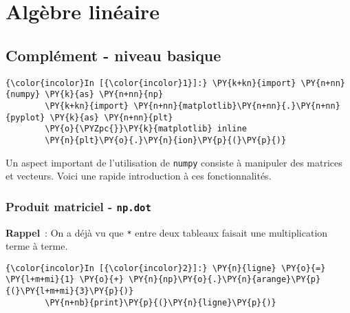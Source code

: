     
    
    
    

    

    \hypertarget{alguxe8bre-linuxe9aire}{%
\section{Algèbre linéaire}\label{alguxe8bre-linuxe9aire}}

    \hypertarget{compluxe9ment---niveau-basique}{%
\subsection{Complément - niveau
basique}\label{compluxe9ment---niveau-basique}}

    \begin{Verbatim}[commandchars=\\\{\},frame=single,framerule=0.3mm,rulecolor=\color{cellframecolor}]
{\color{incolor}In [{\color{incolor}1}]:} \PY{k+kn}{import} \PY{n+nn}{numpy} \PY{k}{as} \PY{n+nn}{np}
        \PY{k+kn}{import} \PY{n+nn}{matplotlib}\PY{n+nn}{.}\PY{n+nn}{pyplot} \PY{k}{as} \PY{n+nn}{plt}
        \PY{o}{\PYZpc{}}\PY{k}{matplotlib} inline
        \PY{n}{plt}\PY{o}{.}\PY{n}{ion}\PY{p}{(}\PY{p}{)}
\end{Verbatim}


    Un aspect important de l'utilisation de \texttt{numpy} consiste à
manipuler des matrices et vecteurs. Voici une rapide introduction à ces
fonctionnalités.

    \hypertarget{produit-matriciel---np.dot}{%
\subsubsection{\texorpdfstring{Produit matriciel -
\texttt{np.dot}}{Produit matriciel - np.dot}}\label{produit-matriciel---np.dot}}

    \textbf{Rappel}~: On a déjà vu que \texttt{*} entre deux tableaux
faisait une multiplication terme à terme.

    \begin{Verbatim}[commandchars=\\\{\},frame=single,framerule=0.3mm,rulecolor=\color{cellframecolor}]
{\color{incolor}In [{\color{incolor}2}]:} \PY{n}{ligne} \PY{o}{=} \PY{l+m+mi}{1} \PY{o}{+} \PY{n}{np}\PY{o}{.}\PY{n}{arange}\PY{p}{(}\PY{l+m+mi}{3}\PY{p}{)}
        \PY{n+nb}{print}\PY{p}{(}\PY{n}{ligne}\PY{p}{)}
\end{Verbatim}


